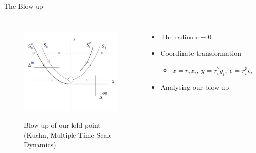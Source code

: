 \documentclass[11pt]{beamer}
\begin{document}
\begin{frame}{The Blow-up}
\begin{columns}
	\begin{figure}
		\centering
		\includegraphics[height=5cm, width=5cm]{Blow_up.png}
		\caption{Blow up of our fold point (Kuehn, Multiple Time Scale Dynamics)}
	\end{figure}
	\begin{itemize}
		
		\item The radius $r=0$
		\item Coordinate transformation
		\begin{itemize}
			\item $x=r_ix_i, \ y=r_i^2y_i, \ \epsilon=r_i^3\epsilon_i$\\
		\end{itemize}
		\item Analysing our blow up
	\end{itemize}
\end{columns}
\end{frame}
\end{document}
